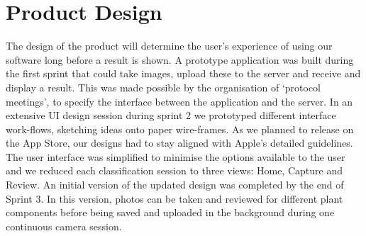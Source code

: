 \documentclass[a4paper,11pt]{article}
\begin{document}
\clearpage


\section{Product Design}

The design of the product will determine the user's experience of using our software long before a result is shown. A prototype application was built during the first sprint that could take images, upload these to the server and receive and display a result. This was made possible by the organisation of `protocol meetings', to specify the interface between the application and the server.  In an extensive UI design session during sprint 2 we prototyped different interface work-flows, sketching ideas onto paper wire-frames. As we planned to release on the App Store, our designs had to stay aligned with Apple's detailed guidelines. The user interface was simplified to minimise the options available to the user and we reduced each classification session to three views: Home, Capture and Review. An initial version of the updated design was completed by the end of Sprint 3. In this version, photos can be taken and reviewed for different plant components before being saved and uploaded in the background during one continuous camera session. 
\end{document}
